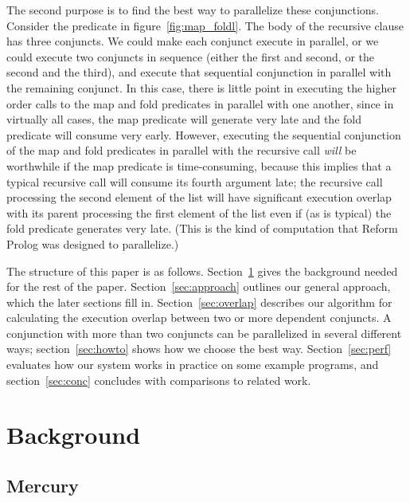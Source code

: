 The second purpose is to find the best way to parallelize these conjunctions.
Consider the \mapfoldl predicate in figure~\ref{fig:map_foldl}.
The body of the recursive clause has three conjuncts.
We could make each conjunct execute in parallel,
or we could execute two conjuncts in sequence
(either the first and second, or the second and the third),
and execute that sequential conjunction in parallel with the remaining conjunct.
In this case, there is little point in executing
the higher order calls to the map and fold predicates
in parallel with one another,
since in virtually all cases,
the map predicate will generate  very late and
the fold predicate will consume  very early.
However, executing the sequential conjunction of the map and fold predicates
in parallel with the recursive call \emph{will} be worthwhile
if the map predicate is time-consuming,
because this implies that
a typical recursive call will consume its fourth argument late;
the recursive call processing the second element of the list
will have significant execution overlap
with its parent processing the first element of the list
even if (as is typical) the fold predicate generates  very late.
(This is the kind of computation that
Reform Prolog \cite{bevemyr:reform} was designed to parallelize.)

The structure of this paper is as follows.
Section~\ref{sec:background} gives
the background needed for the rest of the paper.
Section~\ref{sec:approach} outlines our general approach,
which the later sections fill in.
Section~\ref{sec:overlap} describes our algorithm for calculating
the execution overlap between two or more dependent conjuncts.
A conjunction with more than two conjuncts can be parallelized
in several different ways;
section~\ref{sec:howto} shows how we choose the best way.
Section~\ref{sec:perf} evaluates
how our system works in practice on some example programs, and
section~\ref{sec:conc} concludes
with comparisons to related work.


\section{Background}
\label{sec:background}

\subsection{Mercury}
\label{sec:backmer}

